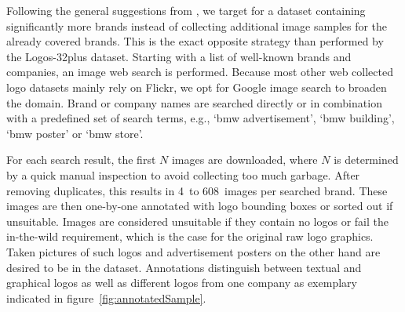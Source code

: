 \documentclass[a4paper,twoside]{article}
\newcommand{\xeg}{e.g.}
\begin{document}
%
Following the general suggestions from \cite{bansal2017}, we target for a dataset containing significantly more brands instead of collecting additional image samples for the already covered brands. This is the exact opposite strategy than performed by the Logos-32plus dataset.
Starting with a list of well-known brands and companies, an image web search is performed. Because most other web collected logo datasets mainly rely on Flickr, we opt for Google image search to broaden the domain. Brand or company names are searched directly or in combination with a predefined set of search terms, \xeg, `bmw advertisement', `bmw building', `bmw poster' or `bmw store'. 

For each search result, the first $N$ images are downloaded, where $N$ is determined by a quick manual inspection to avoid collecting too much garbage. 
After removing duplicates, this results in 4~to 608~images per searched brand. These images are then one-by-one annotated with logo bounding boxes or sorted out if unsuitable.
Images are considered unsuitable if they contain no logos or fail the in-the-wild requirement, which is the case for the original raw logo graphics. Taken pictures of such logos and advertisement posters on the other hand are desired to be in the dataset. 
Annotations distinguish between textual and graphical logos as well as different logos from one company as exemplary indicated in figure~\ref{fig:annotatedSample}.
%
\end{document}
